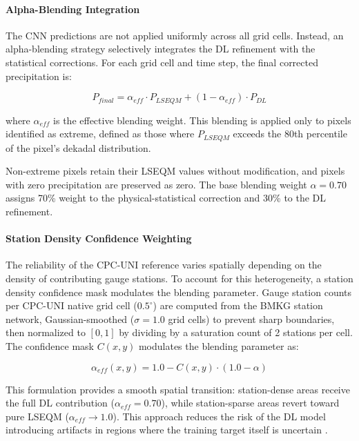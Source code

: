 \documentclass[11pt,a4paper]{article}
\begin{document}
\paragraph{Alpha-Blending Integration}

The CNN predictions are not applied uniformly across all grid cells.
Instead, an alpha-blending strategy selectively integrates the DL
refinement with the statistical corrections. For each grid cell and time
step, the final corrected precipitation is:

\begin{equation}P_{final} = \alpha_{eff} \cdot P_{LSEQM} + (1 - \alpha_{eff}) \cdot P_{DL}\end{equation}

where \(\alpha_{eff}\) is the effective blending weight. This blending
is applied only to pixels identified as extreme, defined as those where
\(P_{LSEQM}\) exceeds the 80th percentile of the pixel's dekadal
distribution.

Non-extreme pixels retain their LSEQM values without modification, and
pixels with zero precipitation are preserved as zero. The base blending
weight \(\alpha = 0.70\) assigns 70\% weight to the physical-statistical
correction and 30\% to the DL refinement.

\paragraph{Station Density Confidence Weighting}

The reliability of the CPC-UNI reference varies spatially depending on
the density of contributing gauge stations. To account for this
heterogeneity, a station density confidence mask modulates the blending
parameter. Gauge station counts per CPC-UNI native grid cell
(\(0.5^{\circ}\)) are computed from the BMKG station network,
Gaussian-smoothed (\(\sigma = 1.0\) grid cells) to prevent sharp
boundaries, then normalized to \([0, 1]\) by dividing by a saturation
count of 2 stations per cell. The confidence mask \(C(x, y)\) modulates
the blending parameter as:

\begin{equation}\alpha_{eff}(x, y) = 1.0 - C(x, y) \cdot (1.0 - \alpha)\end{equation}

This formulation provides a smooth spatial transition: station-dense
areas receive the full DL contribution (\(\alpha_{eff} = 0.70\)), while
station-sparse areas revert toward pure LSEQM
(\(\alpha_{eff} \rightarrow 1.0\)). This approach reduces the risk of
the DL model introducing artifacts in regions where the training target
itself is uncertain \cite{ref27}.
\end{document}
